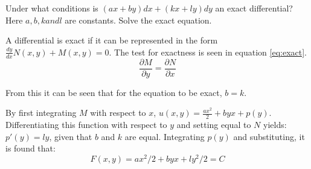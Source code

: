 Under what conditions is $\left(ax+by\right)dx+\left(kx+ly\right)dy$ an exact differential? Here $a, b, k and l$ are constants. Solve the exact equation.

A differential is exact if it can be represented in the form $\frac{dy}{dx}N(x,y)+M(x,y)=0$. The test for exactness is seen in equation \ref{eq:exact}.
\begin{equation}
	\frac{\partial M}{\partial y}=\frac{\partial N}{\partial x}
	\label{eq:exact}
\end{equation}

From this it can be seen that for the equation to be exact, $b=k$. 

By first integrating $M$ with respect to $x$, $u(x,y)=\frac{ax^2}{2}+byx+p(y)$. Differentiating this function with respect to $y$ and setting equal to $N$ yields: $p\prime(y)=ly$, given that $b$ and $k$ are equal. Integrating $p(y)$ and substituting, it is found that:
\begin{equation*}
	\boxed {
	F(x,y)=ax^2/2+byx+ly^2/2=C
	}
\end{equation*}
